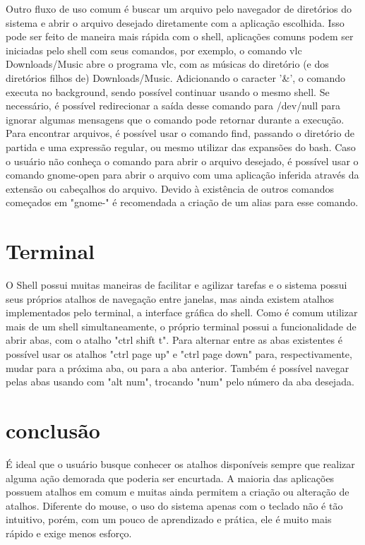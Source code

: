 \documentclass[oneside, 11 pt]{article}
\begin{document}
	Outro fluxo de uso comum é buscar um arquivo pelo navegador de diretórios do sistema e abrir o arquivo desejado diretamente com a aplicação escolhida. Isso pode ser feito de maneira mais rápida com o shell, aplicações comuns podem ser iniciadas pelo shell com seus comandos, por exemplo, o comando vlc Downloads/Music abre o programa vlc, com as músicas do diretório (e dos diretórios filhos de) Downloads/Music. Adicionando o caracter '\&', o comando executa no background, sendo possível continuar usando o mesmo shell. Se necessário, é possível redirecionar a saída desse comando para /dev/null para ignorar algumas mensagens que o comando pode retornar durante a execução.
	Para encontrar arquivos, é possível usar o comando find, passando o diretório de partida e uma expressão regular, ou mesmo utilizar das expansões do bash.
	Caso o usuário não conheça o comando para abrir o arquivo desejado, é possível usar o comando gnome-open para abrir o arquivo com uma aplicação inferida através da extensão ou cabeçalhos do arquivo. Devido à existência de outros comandos começados em "gnome-" é recomendada a criação de um alias para esse comando.
	
	\section{Terminal}
	O Shell possui muitas maneiras de facilitar e agilizar tarefas e o sistema possui seus próprios atalhos de navegação entre janelas, mas ainda existem atalhos implementados pelo terminal, a interface gráfica do shell. Como é comum utilizar mais de um shell simultaneamente, o próprio terminal possui a funcionalidade de abrir abas, com o atalho "ctrl shift t". Para alternar entre as abas existentes é possível usar os atalhos "ctrl page up" e "ctrl page down" para, respectivamente, mudar para a próxima aba, ou para a aba anterior. Também é possível navegar pelas abas usando com "alt num", trocando "num" pelo número da aba desejada.	
	
	\section{conclusão}
	É ideal que o usuário busque conhecer os atalhos disponíveis sempre que realizar alguma ação demorada que poderia ser encurtada. A maioria das aplicações possuem atalhos em comum e muitas ainda permitem a criação ou alteração de atalhos. Diferente do mouse, o uso do sistema apenas com o teclado não é tão intuitivo, porém, com um pouco de aprendizado e prática, ele é muito mais rápido e exige menos esforço.


\end{document}
